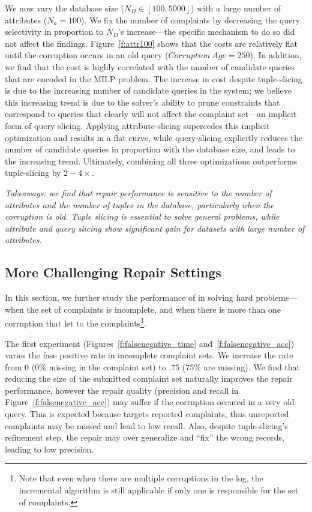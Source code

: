  
We now vary the database size ($N_D \in [100,5000]$) with a large number of attributes ($N_a = 100$).
We fix the number of complaints by decreasing the query selectivity in proportion to $N_D$'s increase---the specific mechanism to do so did not affect the findings.
Figure~\ref{f:attr100} shows that the costs are relatively flat until the corruption occurs in an old query ($Corruption\ Age = 250$).  
In addition, we find that the cost is highly correlated with the number of candidate queries that are encoded in the MILP problem.
The increase in cost despite tuple-slicing is due to the increasing number of candidate queries in the system; 
we believe this increasing trend is due to the solver's ability to prune constraints that correspond to queries that clearly will not affect the complaint set---an implicit form of query slicing.  
Applying attribute-slicing supercedes this implicit optimization and results in a flat curve, 
while query-slicing explicitly reduces the number of candidate queries in proportion with the database size, and leads to the increasing trend.
Ultimately, combining all three optimizations outperforms tuple-slicing by $2-4\times$.

\smallskip
\textit{
  Takeaways: we find that repair performance is sensitive to 
  the number of attributes and the number of tuples in the database, particularly when the corruption is old. 
  Tuple slicing is essential to solve general problems, while attribute and query slicing show significant gain for datasets with large number of attributes.
}



\subsection{More Challenging Repair Settings}
\label{sec:experiments:hardprob}

In this section, we further study the performance of \sys in solving hard problems---when the set of complaints is incomplete, and when there is more than one corruption that let to the complaints\footnote{
\footnotesize Note that even when there are multiple corruptions in the log, the incremental algorithm is still applicable if only one is responsible for the set of complaints.}.
 
 
The first experiment (Figures~\ref{f:falsenegative_time} and~\ref{f:falsenegative_acc}) varies the fase positive rate in incomplete complaint sets.
We increase the rate from $0$ ($0\%$ missing in the complaint set) to $.75$ ($75\%$ are missing).  
We find that reducing the size of the submitted complaint set naturally improves the repair performance,
however the repair quality  (precision and recall in Figure~\ref{f:falsenegative_acc}) may suffer if the corruption occured in a very old query. 
This is expected because \sys targets reported complaints, thus unreported complaints may be missed and lead to low recall.
Also, despite tuple-slicing's refinement step, the repair may over generalize and ``fix'' the wrong records, leading to low precision.


